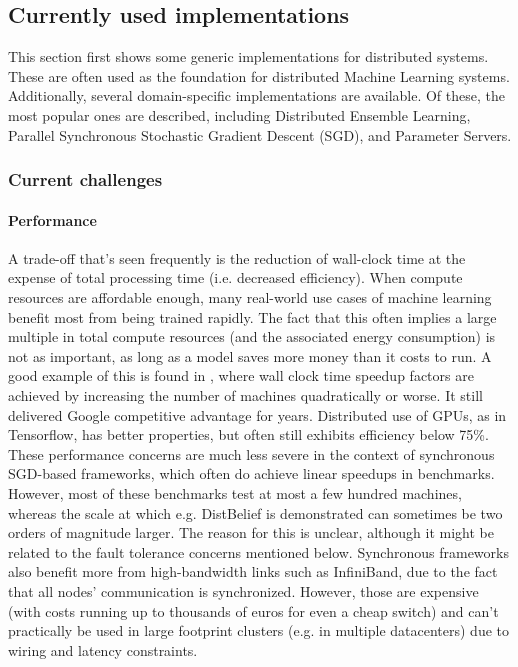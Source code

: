 









\subsection{Currently used implementations}
This section first shows some generic implementations for distributed systems. These are often used as the foundation for distributed Machine Learning systems. Additionally, several domain-specific implementations are available. Of these, the most popular ones are described, including Distributed Ensemble Learning, Parallel Synchronous Stochastic Gradient Descent (SGD), and Parameter Servers.



\subsubsection{Current challenges}
\paragraph{Performance}

A trade-off that’s seen frequently is the reduction of wall-clock time at the expense of total processing time (i.e. decreased efficiency). When compute resources are affordable enough, many real-world use cases of machine learning benefit most from being trained rapidly. The fact that this often implies a large multiple in total compute resources (and the associated energy consumption) is not as important, as long as a model saves more money than it costs to run.  A good example of this is found in \citet{DistBelief2012}, where wall clock time speedup factors are achieved by increasing the number of machines quadratically or worse. It still delivered Google competitive advantage for years. Distributed use of GPUs, as in Tensorflow, has better properties, but often still exhibits efficiency below 75\%.
These performance concerns are much less severe in the context of synchronous SGD-based frameworks, which often do achieve linear speedups in benchmarks. However, most of these benchmarks test at most a few hundred machines, whereas the scale at which e.g. DistBelief is demonstrated can sometimes be two orders of magnitude larger. The reason for this is unclear, although it might be related to the fault tolerance concerns mentioned below. Synchronous frameworks also benefit more from high-bandwidth links such as InfiniBand, due to the fact that all nodes' communication is synchronized. However, those are expensive (with costs running up to thousands of euros for even a cheap switch) and can't practically be used in large footprint clusters (e.g. in multiple datacenters) due to wiring and latency constraints.

